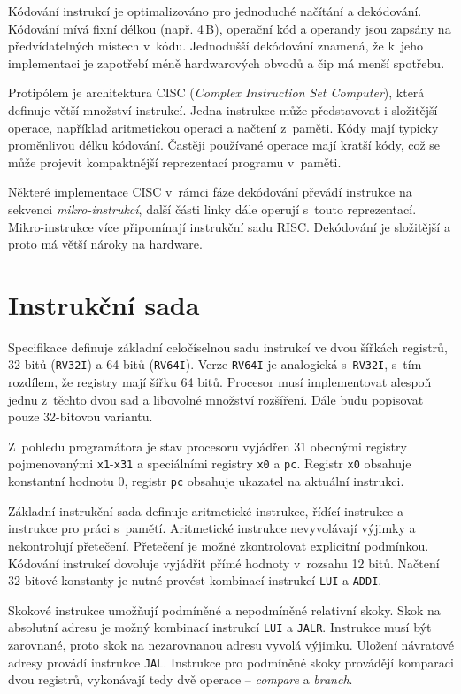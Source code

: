 Kódování instrukcí je optimalizováno pro jednoduché načítání a dekódování.
Kódování mívá fixní délkou (např. 4\,B), operační kód a operandy jsou zapsány na předvídatelných místech v~kódu.
Jednodušší dekódování znamená, že k~jeho implementaci je zapotřebí méně hardwarových obvodů a čip má menší spotřebu.

Protipólem je architektura CISC (\emph{Complex Instruction Set Computer}), která definuje větší množství instrukcí.
Jedna instrukce může představovat i složitější operace, například aritmetickou operaci a načtení z~paměti. Kódy mají typicky proměnlivou délku kódování.
Častěji používané operace mají kratší kódy, což se může projevit kompaktnější reprezentací programu v~paměti.

Některé implementace CISC v~rámci fáze dekódování převádí instrukce na sekvenci \emph{mikro-instrukcí}, další části linky dále operují s~touto reprezentací.
Mikro-instrukce více připomínají instrukční sadu RISC.
Dekódování je složitější a proto má větší nároky na hardware.

\section{Instrukční sada}

Specifikace definuje základní celočíselnou sadu instrukcí ve dvou šířkách registrů, 32 bitů (\texttt{RV32I}) a 64 bitů (\texttt{RV64I}).
Verze \texttt{RV64I} je analogická s~\texttt{RV32I}, s~tím rozdílem, že registry mají šířku 64 bitů.
Procesor musí implementovat alespoň jednu z~těchto dvou sad a libovolné množství rozšíření.
Dále budu popisovat pouze 32-bitovou variantu.

Z~pohledu programátora je stav procesoru vyjádřen 31 obecnými registry pojmenovanými \texttt{x1}-\texttt{x31} a speciálními registry \texttt{x0} a \texttt{pc}.
Registr \texttt{x0} obsahuje konstantní hodnotu 0, registr \texttt{pc} obsahuje ukazatel na aktuální instrukci.

Základní instrukční sada definuje aritmetické instrukce, řídící instrukce a instrukce pro práci s~pamětí.
Aritmetické instrukce nevyvolávají výjimky a nekontrolují přetečení.
Přetečení je možné zkontrolovat explicitní podmínkou.
Kódování instrukcí dovoluje vyjádřit přímé hodnoty v~rozsahu 12 bitů.
Načtení 32 bitové konstanty je nutné provést kombinací instrukcí \texttt{LUI} a \texttt{ADDI}.

Skokové instrukce umožňují podmíněné a nepodmíněné relativní skoky.
Skok na absolutní adresu je možný kombinací instrukcí \texttt{LUI} a \texttt{JALR}.
Instrukce musí být zarovnané, proto skok na nezarovnanou adresu vyvolá výjimku.
Uložení návratové adresy provádí instrukce \texttt{JAL}.
Instrukce pro podmíněné skoky provádějí komparaci dvou registrů, vykonávají tedy dvě operace -- \emph{compare} a \emph{branch}.

